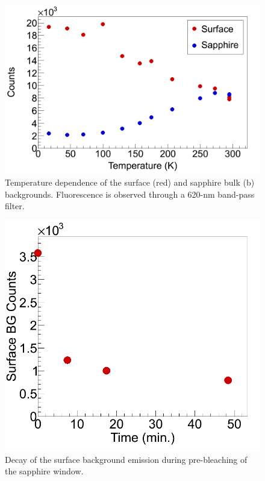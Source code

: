 



\begin{figure} %
        \centering
                \includegraphics[width=.6\textwidth]{figures/bg_temp_dep.png}
                \caption{Temperature dependence of the surface (red) and sapphire bulk (b) backgrounds. Fluorescence is observed through a 620-nm band-pass filter.}
\label{fig:BGtempDependence}
\end{figure}

\begin{figure} %
        \centering
                \includegraphics[width=.4\textwidth]{figures/Bleach_SurfaceBG_20150807_part1_vsTime.png}
                \caption{Decay of the surface background emission during pre-bleaching of the sapphire window.}
\label{fig:surfBGbleach}
\end{figure}

